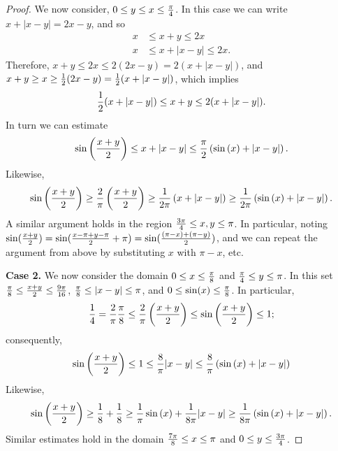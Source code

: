 \documentclass[10pt,a4paper]{amsart}
\begin{document}
\begin{proof}
We now consider, $0 \leq y \leq x \leq {\pi \over 4}$.  In this case we can write $x + |x-y| = 2x - y$, and so
\begin{align*}
    x &\leq x+ y \leq 2x\\
     x & \leq x + |x - y| \leq 2x.  
\end{align*}
Therefore, $x+ y  \leq 2 x \leq 2 ( 2 x - y)= 2 ( x + |x -y|)$, 
and $x+ y \geq x \geq {1\over 2} ( 2 x - y) = {1\over 2} ( x + |x -y|)$, 
which implies
\begin{align*}
    {1\over 2} ( x + |x -y|) \leq x + y \leq 2 ( x + |x -y|).
\end{align*}
In turn we can estimate 
\begin{align*}
\sin \left( {x + y\over 2} \right)  
 \leq x + |x -y| 
\leq {\pi\over 2} \left( \sin\left( x\right) + |x - y|  \right). 
\end{align*}
Likewise, 
\begin{align*}
\sin \left( {x + y\over 2} \right)  
 \geq {2 \over \pi} \left( {x + y \over 2} \right) 
\geq {1\over 2 \pi} \left( x + |x -y| \right)
\geq {1\over 2\pi} \left( \sin\left( x \right) + |x - y|  \right). 
\end{align*}
A similar argument holds in the region ${3 \pi \over4 } \leq x,y \leq \pi$. In particular, noting $\sin({x+y\over2}) = \sin({x-\pi+y-\pi\over2}+\pi) = \sin({(\pi - x )+ (\pi-y)\over2})$, and we can repeat the argument from above by substituting $x$ with $\pi - x$, etc.

\textbf{Case 2.} We now consider the domain $0 \leq x \leq {\pi \over 8}$ and ${\pi \over 4} \leq y \leq \pi$.  In this set 
${\pi \over 8} \leq {x+y\over 2} \leq {9 \pi \over 16}$,  ${\pi \over 8} \leq |x -y| \leq \pi$, and $0\leq \sin(x) \leq {\pi \over 8}$.  In particular,
\[
{1\over 4} = {2 \over \pi} {\pi \over 8} \leq {2 \over \pi}\left( {x + y\over 2} \right) \leq \sin \left( {x + y\over 2} \right)
\leq 1 ;
\]
consequently, 
\begin{align*}
\sin\left( {x + y\over 2} \right)
\leq 1 \leq {8 \over \pi} |x - y| \leq {8 \over \pi} \left( \sin\left( x \right) + |x - y|  \right)
\end{align*}
Likewise,
\begin{align*}
\sin\left( {x + y\over 2} \right)
\geq {1\over 8} + {1\over 8} \geq
{1\over \pi} \sin\left( x\right) + {1\over 8 \pi} |x-y| \geq {1\over 8 \pi}\left( \sin\left( x\right) + |x - y| \right).
\end{align*}
Similar estimates hold in the domain ${7\pi \over 8} \leq x \leq {\pi }$ and ${0} \leq y \leq {3\pi \over 4}$.  


\end{proof}
\end{document}
